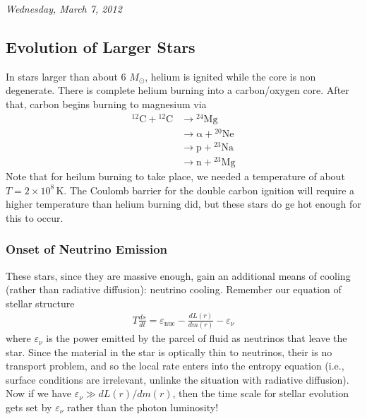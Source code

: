 \documentclass[10pt]{article}
\numberwithin{equation}{section}
\newcommand{\n}{\noindent}
\begin{document}
    \n \textit{Wednesday, March 7, 2012}
    \subsection{Evolution of Larger Stars}
    \label{sec:evolution-gt-6}
    In stars larger than about 6 $M_\odot$, helium is ignited while
    the core is non degenerate. There is complete helium burning into
    a carbon/oxygen core. After that, carbon begins burning to
    magnesium via
    \begin{align}
      \label{eq:336}
      \mathrm{{}^{12}C+{}^{12}C}&\to \mathrm{{}^{24}Mg}\\
      &\to \mathrm{\alpha+{}^{20}Ne}\\
      &\to \mathrm{p+{}^{23}Na}\\
      &\to \mathrm{n+{}^{23}Mg}
    \end{align}
    Note that for heilum burning to take place, we needed a
    temperature of about $T=2\times 10^8\,\mathrm{K}$. The Coulomb
    barrier for the double carbon ignition will require a higher
    temperature than helium burning did, but these stars do ge hot
    enough for this to occur. 

    \subsubsection{Onset of Neutrino Emission}
    \label{sec:onset-neutr-emiss}

    These stars, since they are massive enough, gain an additional
    means of cooling (rather than radiative diffusion): neutrino
    cooling. Remember our equation of stellar structure
    \begin{align}
      \label{eq:337}
      T\frac{ds}{dt}=\varepsilon_{\mathrm{nuc}}-\frac{dL(r)}{dm(r)}-
\varepsilon_\nu
    \end{align}
    where $\varepsilon_\nu$ is the power emitted by the parcel of
    fluid as neutrinos that leave the star. Since the material in the
    star is optically thin to neutrinos, their is no transport
    problem, and so the local rate enters into the entropy equation
    (i.e., surface conditions are irrelevant, unlinke the situation
    with radiative diffusion).\\

    \n Now if we have $\varepsilon_\nu\gg dL(r)/dm(r)$, then the time
    scale for stellar evolution gets set by $\varepsilon_\nu$ rather
    than the photon luminosity!\\
\end{document}
